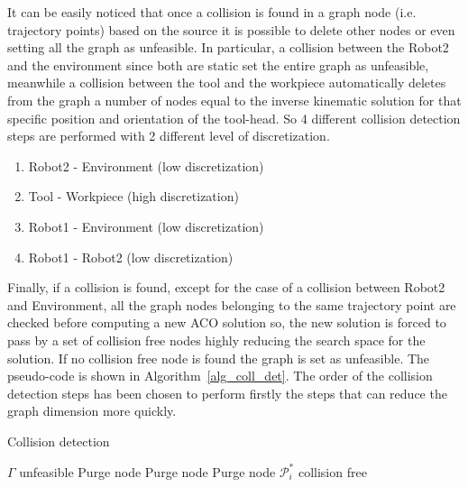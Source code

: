\documentclass[twocolumn]{svjour3}
\begin{document}
It can be easily noticed that once a collision is found in a graph node (i.e. trajectory points) based on the source it is possible to delete other nodes or even setting all the graph as unfeasible. In particular, a collision between the Robot2 and the environment since both are static set the entire graph as unfeasible, meanwhile a collision between the tool and the workpiece automatically deletes from the graph a number of nodes equal to the inverse kinematic solution for that specific position and orientation of the tool-head. So 4 different collision detection steps are performed with 2 different level of discretization.
\begin{enumerate}
	\item Robot2 - Environment (low discretization)
	\item Tool - Workpiece (high discretization)
	\item Robot1 - Environment (low discretization)
	\item Robot1 - Robot2 (low discretization)
\end{enumerate}
Finally, if a collision is found, except for the case of a collision between Robot2 and Environment, all the graph nodes belonging to the same trajectory point are checked before computing a new ACO solution so, the new solution is forced to pass by a set of collision free nodes highly reducing the search space for the solution. If no collision free node is found the graph is set as unfeasible. The pseudo-code is shown in Algorithm~\ref{alg_coll_det}. The order of the collision detection steps has been chosen to perform firstly the steps that can reduce the graph dimension more quickly.

\begin{algorithm}[t]
	\footnotesize
	\caption{Collision detection}
	\label{alg_coll_det}
	\begin{algorithmic}[1]
	    \State \Return $\Gamma$ unfeasible
    \EndIf
		            \State Purge node
	            \EndIf
		    \EndFor
		    \State \Return
	    \EndIf
    \EndFor
		            \State Purge node
	            \EndIf
	        \EndFor
	        \State \Return
	    \EndIf
    \EndFor
		            \State Purge node
	            \EndIf
	        \EndFor
	        \State \Return
	    \EndIf
    \EndFor
    \State \Return $\mathcal{P}^*_i$ collision free
	\end{algorithmic}
\end{algorithm}
\end{document}
